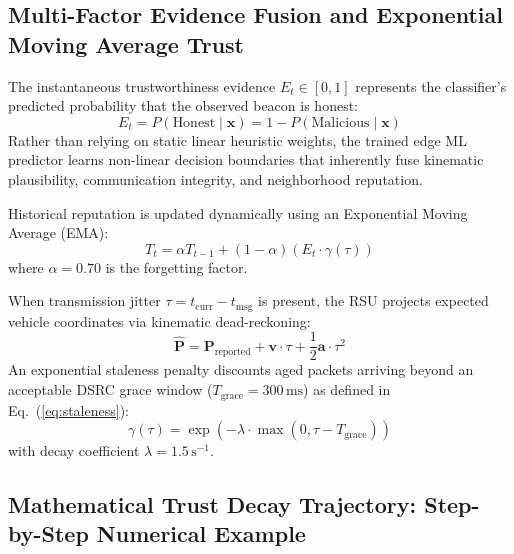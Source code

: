 \documentclass[conference]{IEEEtran}
\begin{document}
\subsection{Multi-Factor Evidence Fusion and Exponential Moving Average Trust}

The instantaneous trustworthiness evidence $E_t \in [0, 1]$ represents the classifier's predicted probability that the observed beacon is honest:
\begin{equation}
E_t = P(\text{Honest} \mid \mathbf{x}) = 1 - P(\text{Malicious} \mid \mathbf{x})
\label{eq:evidence_def}
\end{equation}
Rather than relying on static linear heuristic weights, the trained edge ML predictor learns non-linear decision boundaries that inherently fuse kinematic plausibility, communication integrity, and neighborhood reputation.

Historical reputation is updated dynamically using an Exponential Moving Average (EMA):
\begin{equation}
T_t = \alpha T_{t-1} + (1-\alpha) \left(E_t \cdot \gamma(\tau)\right)
\label{eq:ema_trust}
\end{equation}
where $\alpha = 0.70$ is the forgetting factor. 

When transmission jitter $\tau = t_{\text{curr}} - t_{\text{msg}}$ is present, the RSU projects expected vehicle coordinates via kinematic dead-reckoning:
\begin{equation}
\hat{\mathbf{P}} = \mathbf{P}_{\text{reported}} + \mathbf{v} \cdot \tau + \frac{1}{2}\mathbf{a}\cdot \tau^2
\label{eq:dead_reckoning}
\end{equation}
An exponential staleness penalty discounts aged packets arriving beyond an acceptable DSRC grace window ($T_{\text{grace}} = 300\,\text{ms}$) as defined in Eq.~(\ref{eq:staleness}):
\begin{equation}
\gamma(\tau) = \exp\left(-\lambda \cdot \max(0, \tau - T_{\text{grace}})\right)
\label{eq:staleness}
\end{equation}
with decay coefficient $\lambda = 1.5\,\text{s}^{-1}$.

\subsection{Mathematical Trust Decay Trajectory: Step-by-Step Numerical Example}
\end{document}
